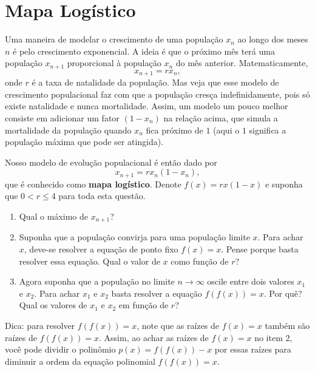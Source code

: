 \documentclass[a4paper,fleqn,12pt]{article}
\begin{document}
\pagebreak

\section{Mapa Logístico}

Uma maneira de modelar o crescimento de uma população $x_n$ ao longo dos meses $n$ é pelo crescimento exponencial. A ideia é que o próximo mês terá uma população $x_{n+1}$ proporcional à população $x_n$ do mês anterior. Matematicamente,
$$
x_{n+1} = r x_n,
$$
onde $r$ é a taxa de natalidade da população. Mas veja que esse modelo de crescimento populacional faz com que a população cresça indefinidamente, pois só existe natalidade e nunca mortalidade. Assim, um modelo um pouco melhor consiste em adicionar um fator $(1 - x_n)$ na relação acima, que simula a mortalidade da população quando $x_n$ fica próximo de $1$ (aqui o $1$ significa a população máxima que pode ser atingida).

Nosso modelo de evolução populacional é então dado por
$$
x_{n+1} = r x_n (1 - x_n),
$$
que é conhecido como \textbf{mapa logístico}. Denote $f(x) = r x ( 1 - x )$ e suponha que $0 < r \leq 4$ para toda esta questão.

\n

\begin{enumerate}
\item Qual o máximo de $x_{n+1}$?
\item Suponha que a população convirja para uma população limite $x$. Para achar $x$, deve-se resolver a equação de ponto fixo $f(x) = x$. Pense porque basta resolver essa equação. Qual o valor de $x$ como função de $r$?
\item Agora suponha que a população no limite $n \to \infty$ oscile entre dois valores $x_1$ e $x_2$. Para achar $x_1$ e $x_2$ basta resolver a equação $f(f(x)) = x$. Por quê? Qual os valores de $x_1$ e $x_2$ em função de $r$?
\end{enumerate}

Dica: para resolver $f(f(x)) = x$, note que as raízes de $f(x) = x$ também são raízes de $f(f(x)) = x$. Assim, ao achar as raízes de $f(x) = x$ no item 2, você pode dividir o polinômio $p(x) = f(f(x)) - x$ por essas raízes para diminuir a ordem da equação polinomial $f(f(x)) = x$.
\end{document}
